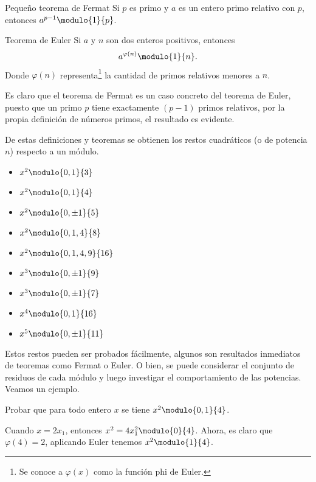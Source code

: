 \begin{theorem.box}{Pequeño teorema de Fermat}{}
    Si $p$ es primo y $a$ es un entero primo relativo con $p$, entonces $a^{p - 1} \modulo{1}{p}$.
\end{theorem.box}

\begin{theorem.box}{Teorema de Euler}{}
    Si $a$ y $n$ son dos enteros positivos, entonces
    \[
        a^{\varphi(n)} \modulo{1}{n}.
    \]
    Donde $\varphi(n)$ representa\footnote{Se conoce a $\varphi(x)$ como la función phi de Euler.} la cantidad de primos relativos menores a $n$.
\end{theorem.box}

Es claro que el teorema de Fermat es un caso concreto del teorema de Euler, puesto que un primo $p$ tiene exactamente
$(p - 1)$ primos relativos, por la propia definición de números primos, el resultado es evidente.

De estas definiciones y teoremas se obtienen los restos cuadráticos (o de potencia $n$) respecto a un módulo.
\begin{multicols}{2}
    \begin{itemize}
        \item $x^2 \modulo{0,1}{3}$
        \item $x^2 \modulo{0,1}{4}$
        \item $x^2 \modulo{0,\pm 1}{5}$
        \item $x^2 \modulo{0,1,4}{8}$
        \item $x^2 \modulo{0,1,4,9}{16}$
        \item $x^3 \modulo{0,\pm 1}{9}$
        \item $x^3 \modulo{0,\pm 1}{7}$
        \item $x^4 \modulo{0,1}{16}$
        \item $x^5 \modulo{0,\pm 1}{11}$
    \end{itemize}
\end{multicols}
Estos restos pueden ser probados fácilmente, algunos son resultados inmediatos de teoremas como Fermat o Euler.
O bien, se puede considerar el conjunto de residuos de cada módulo y luego investigar el comportamiento de las potencias.
Veamos un ejemplo.

\begin{example}
    Probar que para todo entero $x$ se tiene $x^2 \modulo{0,1}{4}$.
\end{example}
\begin{solution}
    Cuando $x = 2x_1$, entonces $x^2 = 4x_1^2 \modulo{0}{4}$.
    Ahora, es claro que $\varphi(4) = 2$, aplicando Euler tenemos $x^2 \modulo{1}{4}$.
\end{solution}

